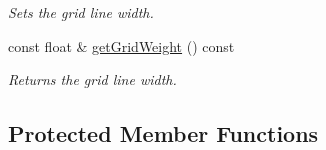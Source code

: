 \begin{DoxyCompactItemize}
\begin{DoxyCompactList}\small\item\em Sets the grid line width. \end{DoxyCompactList}\item 
\hypertarget{class_gui_plot_ae9cd92ed86587648db2148e69e93ed7e}{const float \& \hyperlink{class_gui_plot_ae9cd92ed86587648db2148e69e93ed7e}{get\-Grid\-Weight} () const }\label{class_gui_plot_ae9cd92ed86587648db2148e69e93ed7e}

\begin{DoxyCompactList}\small\item\em Returns the grid line width. \end{DoxyCompactList}\end{DoxyCompactItemize}
\subsection*{Protected Member Functions}
